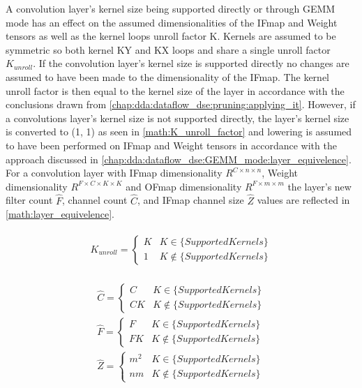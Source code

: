 A convolution layer's kernel size being supported directly or
through GEMM mode has an effect on the assumed
dimensionalities of the IFmap and Weight tensors as well as the kernel loops
unroll factor K. Kernels are assumed to be symmetric so both kernel KY and KX
loops and share a single unroll factor $K_{unroll}$. If the convolution layer's
kernel size is supported directly no changes are assumed to have been made to
the dimensionality of the IFmap. The kernel unroll factor is then equal to the
kernel size of the layer in accordance with the conclusions drawn from
\autoref{chap:dda:dataflow_dse:pruning:applying_it}. However, if
a convolutions layer's kernel size is not supported directly, the layer's kernel
size is converted to (1, 1) as seen in \autoref{math:K_unroll_factor} and lowering
is assumed to have been performed on IFmap and Weight tensors in accordance with
the approach discussed in \autoref{chap:dda:dataflow_dse:GEMM_mode:layer_equivelence}. For a convolution
layer with IFmap dimensionality $R^{C\times n\times n}$, Weight dimensionality
$R^{F\times C\times K\times K}$ and OFmap dimensionality $R^{F\times m\times m}$
the layer's new filter count $\hat{F}$, channel count $\hat{C}$, and IFmap
channel size $\hat{Z}$ values are reflected in \autoref{math:layer_equivelence}. 

\begin{align}
    \begin{gathered}
        K_{unroll} = \begin{cases} K & K \in \{SupportedKernels\}\\1 &K \notin \{SupportedKernels\}\end{cases}
            \end{gathered}
    \label{math:K_unroll_factor}
\end{align}

\begin{align}
    \begin{gathered}
        \hat{C} = \begin{cases} C &  K \in \{SupportedKernels\}\\ CK & K \notin \{SupportedKernels\}\end{cases} \\
        \hat{F} = \begin{cases} F &  K \in \{SupportedKernels\}\\ FK & K \notin \{SupportedKernels\}\end{cases} \\
        \hat{Z} = \begin{cases} m^2 &  K \in \{SupportedKernels\}\\ nm & K \notin \{SupportedKernels\}\end{cases}
            \end{gathered}
    \label{math:layer_equivelence}
\end{align}

